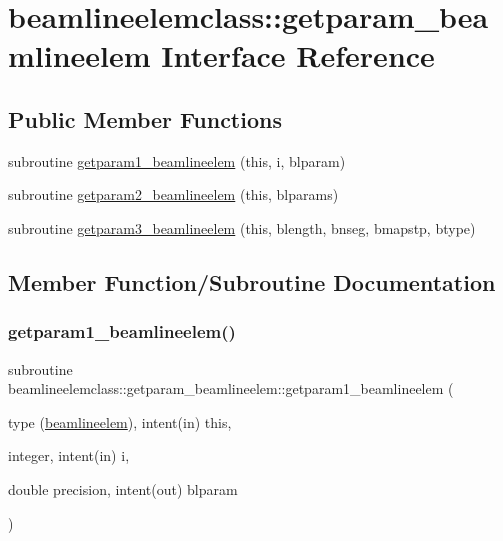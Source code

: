 \hypertarget{interfacebeamlineelemclass_1_1getparam__beamlineelem}{}\section{beamlineelemclass\+::getparam\+\_\+beamlineelem Interface Reference}
\label{interfacebeamlineelemclass_1_1getparam__beamlineelem}
\subsection*{Public Member Functions}
\begin{DoxyCompactItemize}
\item 
subroutine \mbox{\hyperlink{interfacebeamlineelemclass_1_1getparam__beamlineelem_a125d7dc31ba96f857b2fbb4af5abfd99}{getparam1\+\_\+beamlineelem}} (this, i, blparam)
\item 
subroutine \mbox{\hyperlink{interfacebeamlineelemclass_1_1getparam__beamlineelem_a22cc3120bbfd4a2f16c7824dcd501614}{getparam2\+\_\+beamlineelem}} (this, blparams)
\item 
subroutine \mbox{\hyperlink{interfacebeamlineelemclass_1_1getparam__beamlineelem_adfbc3eec44b2546e0887530537bb256b}{getparam3\+\_\+beamlineelem}} (this, blength, bnseg, bmapstp, btype)
\end{DoxyCompactItemize}


\subsection{Member Function/\+Subroutine Documentation}
\mbox{\label{interfacebeamlineelemclass_1_1getparam__beamlineelem_a125d7dc31ba96f857b2fbb4af5abfd99}} 
\subsubsection{\texorpdfstring{getparam1\_beamlineelem()}{getparam1\_beamlineelem()}}
{\footnotesize\ttfamily subroutine beamlineelemclass\+::getparam\+\_\+beamlineelem\+::getparam1\+\_\+beamlineelem (\begin{DoxyParamCaption}\item[{type (\mbox{\hyperlink{namespacebeamlineelemclass_structbeamlineelemclass_1_1beamlineelem}{beamlineelem}}), intent(in)}]{this,  }\item[{integer, intent(in)}]{i,  }\item[{double precision, intent(out)}]{blparam }\end{DoxyParamCaption})}

